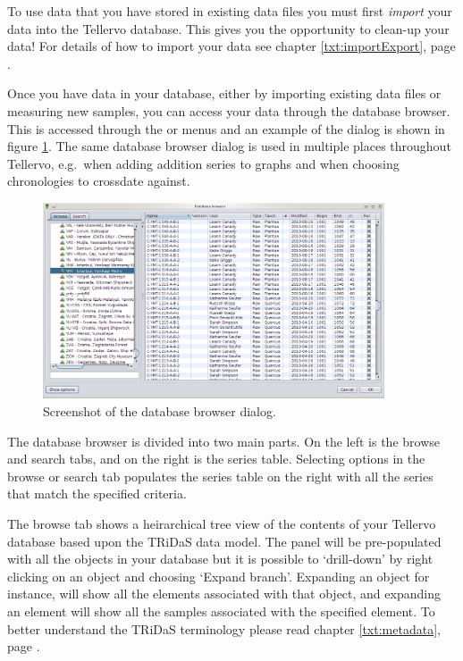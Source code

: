 To use data that you have stored in existing data files you must first \emph{import} your data into the Tellervo database.  This gives you the opportunity to clean-up your data!  For details of how to import your data see chapter \ref{txt:importExport}, page \pageref{txt:importExport}.

Once you have data in your database, either by importing existing data files or measuring new samples, you can access your data through the database browser.  This is accessed through the  or  menus and an example of the dialog is shown in figure \ref{fig:dbbrowser}. The same database browser dialog is used in multiple places throughout Tellervo, e.g.\ when adding addition series to graphs and when choosing chronologies to crossdate against. 

\begin{figure}[hbtp]
  \centering
    \includegraphics[width=0.9\textwidth]{Images/dbbrowser.png}
    \caption{Screenshot of the database browser dialog.}
    \label{fig:dbbrowser}
\end{figure}

The database browser is divided into two main parts.  On the left is the browse and search tabs, and on the right is the series table.  Selecting options in the browse or search tab populates the series table on the right with all the series that match the specified criteria.  


The browse tab shows a heirarchical tree view of the contents of your Tellervo database based upon the TRiDaS data model.  The panel will be pre-populated with all the objects in your database but it is possible to `drill-down' by right clicking on an object and choosing `Expand branch'.  Expanding an object for instance, will show all the elements associated with that object, and expanding an element will show all the samples associated with the specified element.  To better understand the TRiDaS terminology please read chapter \ref{txt:metadata}, page \pageref{txt:metadata}.

